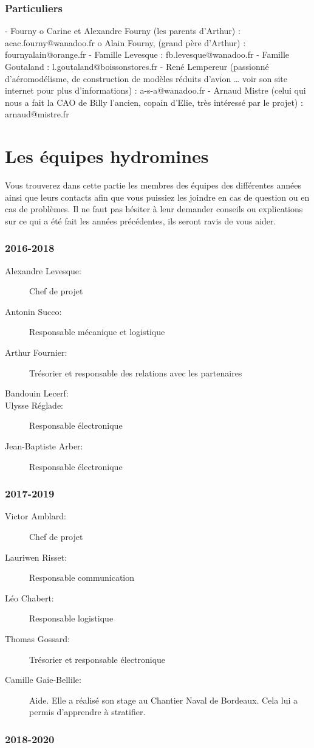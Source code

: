 \documentclass[a4paper, 11pt]{report}
\begin{document}
\section{Particuliers}
-	Fourny 
o	Carine et Alexandre Fourny (les parents d’Arthur) : acac.fourny@wanadoo.fr
o	Alain Fourny, (grand père d’Arthur) :  fournyalain@orange.fr
-	Famille Levesque :  fb.levesque@wanadoo.fr
-	Famille Goutaland :  l.goutaland@boissonstores.fr
-	René Lempereur (passionné d’aéromodélisme, de construction de modèles réduits d’avion … voir son site internet pour plus d’informations) : a-s-a@wanadoo.fr
-	Arnaud Mistre (celui qui nous a fait la CAO de Billy l’ancien, copain d’Elie, très intéressé par le projet) : arnaud@mistre.fr


\part{Les équipes hydromines}
Vous trouverez dans cette partie les membres des équipes des différentes années ainsi que leurs contacts afin que vous puissiez les joindre en cas de question ou en cas de problèmes. Il ne faut pas hésiter à leur demander conseils ou explications sur ce qui a été fait les années précédentes, ils seront ravis de vous aider.

\section{2016-2018}

\begin{description}
\item[Alexandre Levesque:]Chef de projet
\item[Antonin Succo:]Responsable mécanique et logistique
\item[Arthur Fournier:]Trésorier et responsable des relations avec les partenaires
\item[Bandouin Lecerf:]
\item[Ulysse Réglade:] Responsable électronique
\item[Jean-Baptiste Arber:] Responsable électronique
\end{description}

\section{2017-2019}

\begin{description}
\item[Victor Amblard:] Chef de projet
\item[Lauriwen Risset:] Responsable communication
\item[Léo Chabert:] Responsable logistique
\item[Thomas Gossard:]Trésorier et responsable électronique
\item[Camille Gaie-Bellile:] Aide. Elle a réalisé son stage au Chantier Naval de Bordeaux. Cela lui a permis d'apprendre à stratifier.
\end{description}

\section{2018-2020}
\end{document}
